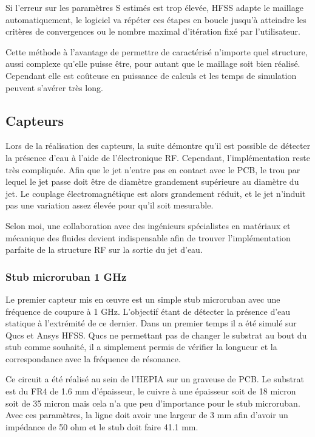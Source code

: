 \documentclass[12pt]{article}
\begin{document}
\vspace{0.5cm}
Si l'erreur sur les paramètres S estimés est trop élevée, HFSS adapte le maillage automatiquement, le logiciel va répéter ces étapes en boucle jusqu’à atteindre les critères de convergences ou le nombre maximal d’itération fixé par l'utilisateur.

\vspace{0.5cm}
Cette méthode à l'avantage de permettre de caractérisé n'importe quel structure, aussi complexe qu'elle puisse être, pour autant que le maillage soit bien réalisé. Cependant elle est coûteuse en puissance de calculs et les temps de simulation peuvent s’avérer très long.

\newpage
\subsection{Capteurs}
Lors de la réalisation des capteurs, la suite démontre qu'il est possible de détecter la présence d'eau à l'aide de l’électronique RF. Cependant, l'implémentation reste très compliquée. Afin que le jet n'entre pas en contact avec le PCB, le trou par lequel le jet passe doit être de diamètre grandement supérieure au diamètre du jet. Le couplage électromagnétique est alors grandement réduit, et le jet n'induit pas une variation assez élevée pour qu'il soit mesurable.

\vspace{0.5cm}
Selon moi, une collaboration avec des ingénieurs spécialistes en matériaux et mécanique des fluides devient indispensable afin de trouver l'implémentation parfaite de la structure RF sur la sortie du jet d'eau.

\newpage
\subsubsection{Stub microruban 1 GHz}
Le premier capteur mis en œuvre est un simple stub microruban avec une fréquence de coupure à 1 GHz. L'objectif étant de détecter la présence d'eau statique à l’extrémité de ce dernier. Dans un premier temps il a été simulé sur Qucs et Ansys HFSS. Qucs ne permettant pas de changer le substrat au bout du stub comme souhaité, il a simplement permis de vérifier la longueur et la correspondance avec la fréquence de résonance. 

\vspace{0.5cm}
Ce circuit a été réalisé au sein de l'HEPIA sur un graveuse de PCB. Le substrat est du FR4 de 1.6 mm d'épaisseur, le cuivre à une épaisseur soit de 18 micron soit de 35 micron mais cela n'a que peu d'importance pour le stub microruban. Avec ces paramètres, la ligne doit avoir une largeur de 3 mm afin d'avoir un impédance de 50 ohm et le stub doit faire 41.1 mm. 
\end{document}
